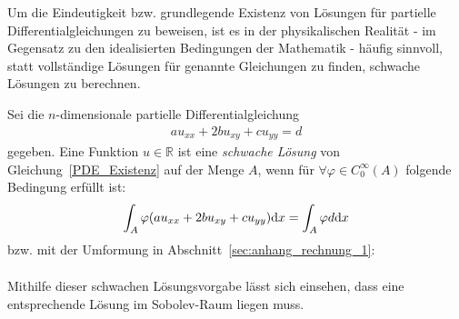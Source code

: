 Um die Eindeutigkeit bzw. grundlegende Existenz von Lösungen für partielle Differentialgleichungen zu beweisen, ist es in der physikalischen Realität - im Gegensatz zu den idealisierten Bedingungen der Mathematik - häufig sinnvoll, statt vollständige Lösungen für genannte Gleichungen zu finden, schwache Lösungen zu berechnen.
\begin{Definition}
    Sei die $n$-dimensionale partielle Differentialgleichung
    \begin{align}
    \label{PDE_Existenz}
        a u_{xx} + 2b u_{xy} + c u_{yy} = d
    \end{align}
    gegeben. Eine Funktion $u\in \mathbb{R}$ ist eine \emph{schwache Lösung} von Gleichung~\eqref{PDE_Existenz} auf der Menge $A$, wenn für $\forall \varphi \in C_0 ^{\infty} (A)$ folgende Bedingung erfüllt ist:
    \begin{align*}
        \int_{A}{\varphi (a u_{xx} + 2b u_{xy} + c u_{yy}) \text{d} x} = \int_{A}{\varphi d \text{d} x}
    \end{align*}
    bzw. mit der Umformung in Abschnitt~\ref{sec:anhang_rechnung_1}: %
    \begin{align*}
    \end{align*}
\end{Definition}
Mithilfe dieser schwachen Lösungsvorgabe lässt sich einsehen, dass eine entsprechende Lösung im Sobolev-Raum liegen muss.